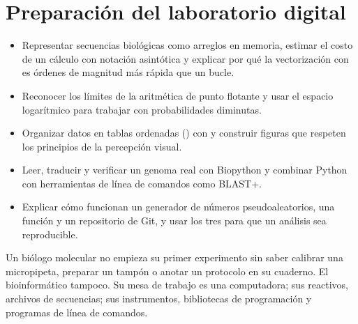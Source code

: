 \chapter{Preparación del laboratorio digital}\label{cap:00}


\begin{objetivos}
\begin{itemize}
  \item Representar secuencias biológicas como arreglos en memoria, estimar el costo de un cálculo con notación asintótica y explicar por qué la vectorización con  es órdenes de magnitud más rápida que un bucle.
  \item Reconocer los límites de la aritmética de punto flotante y usar el espacio logarítmico para trabajar con probabilidades diminutas.
  \item Organizar datos en tablas ordenadas () con  y construir figuras que respeten los principios de la percepción visual.
  \item Leer, traducir y verificar un genoma real con Biopython y combinar Python con herramientas de línea de comandos como BLAST+.
  \item Explicar cómo funcionan un generador de números pseudoaleatorios, una función  y un repositorio de Git, y usar los tres para que un análisis sea reproducible.
\end{itemize}
\end{objetivos}

Un biólogo molecular no empieza su primer experimento sin saber calibrar una micropipeta, preparar un tampón o anotar un protocolo en su cuaderno. El bioinformático tampoco. Su mesa de trabajo es una computadora; sus reactivos, archivos de secuencias; sus instrumentos, bibliotecas de programación y programas de línea de comandos.

